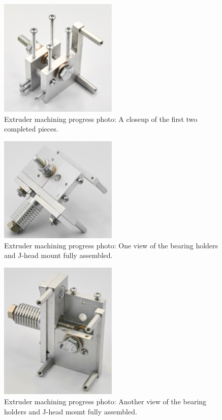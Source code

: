 \begin{figure}[h!]
\centering
\includegraphics[width=0.5\textwidth]{./figures/extruder-progress-2}
\caption{Extruder machining progress photo: A closeup of the first two completed pieces.}
\label{fig:extruder-progress-2}
\end{figure}

\begin{figure}[h!]
\centering
\includegraphics[width=0.5\textwidth]{./figures/extruder-progress-3}
\caption{Extruder machining progress photo: One view of the bearing holders and J-head mount fully assembled.}
\label{fig:extruder-progress-3}
\end{figure}

\begin{figure}[h!]
\centering
\includegraphics[width=0.5\textwidth]{./figures/extruder-progress-4}
\caption{Extruder machining progress photo: Another view of the bearing holders and J-head mount fully assembled.}
\label{fig:extruder-progress-4}
\end{figure}

